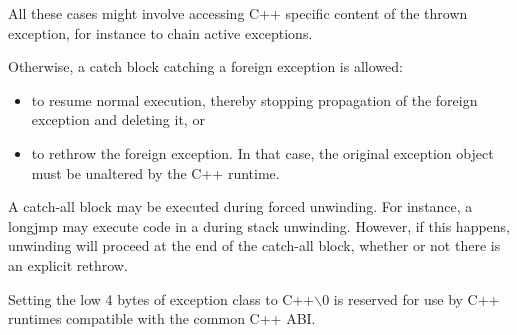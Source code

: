 All these cases might involve accessing C++ specific content of the
thrown exception, for instance to chain active exceptions.

Otherwise, a catch block catching a foreign exception is allowed:
\begin{itemize}
\item to resume normal execution, thereby stopping propagation of
      the foreign exception and deleting it, or
\item to rethrow the foreign exception. In that case, the original
      exception object must be unaltered by the C++ runtime.
\end{itemize}

A catch-all block may be executed during forced unwinding.  For
instance, a longjmp may execute code in a  during
stack unwinding. However, if this happens, unwinding will proceed at
the end of the catch-all block, whether or not there is an explicit
rethrow.

Setting the low 4 bytes of exception class to C++$\backslash$0 is reserved
for use by C++ runtimes compatible with the common C++ ABI.

